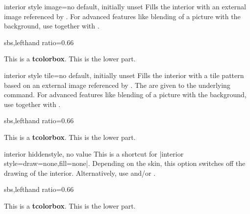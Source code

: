 \clearpage
\begin{docTcbKey}{interior style image}{=}{no default, initially unset}
  Fills the interior with an external image referenced by .
  For advanced features like blending of a picture with the background,
  use  together with .
\begin{dispExample*}{sbs,lefthand ratio=0.66}

\begin{tcolorbox}[enhanced,title=My title,
  interior style image=goldshade.png]
This is a \textbf{tcolorbox}.
\tcblower
This is the lower part.
\end{tcolorbox}
\end{dispExample*}
\end{docTcbKey}


\begin{docTcbKey}{interior style tile}{=}{no default, initially unset}
  Fills the interior with a tile pattern based on an external image referenced by .
  The  are given to the underlying  command.
  For advanced features like blending of a picture with the background,
  use  together with .

\begin{dispExample*}{sbs,lefthand ratio=0.66}

\begin{tcolorbox}[enhanced,title=My title,
  interior style tile={width=2cm}{crinklepaper.png}]
This is a \textbf{tcolorbox}.
\tcblower
This is the lower part.
\end{tcolorbox}
\end{dispExample*}
\end{docTcbKey}


\begin{docTcbKey}{interior hidden}{}{style, no value}
  This is a shortcut for |interior style={draw=none,fill=none}|.
  Depending on the skin, this option switches off the drawing of the
  interior.
  Alternatively, use  and/or .
\begin{dispExample*}{sbs,lefthand ratio=0.66}

\begin{tcolorbox}[enhanced,title=My title,
  interior hidden]
This is a \textbf{tcolorbox}.
\tcblower
This is the lower part.
\end{tcolorbox}
\end{dispExample*}
\end{docTcbKey}

